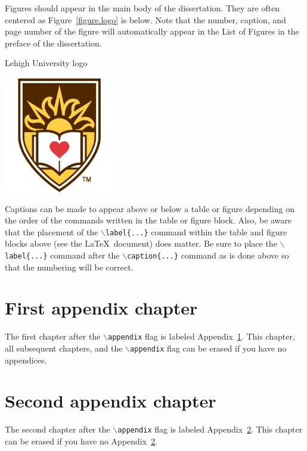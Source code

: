 \documentclass[11pt]{report}
\begin{document}
Figures should appear in the main body of the dissertation.  They are often centered as Figure~\ref{figure.logo} is below.  Note that the number, caption, and page number of the figure will automatically appear in the List of Figures in the preface of the dissertation.

\bfigure[h]
  \centering
  \caption{Lehigh University logo}
  \label{figure.logo}
  \includegraphics[height=2in]{images/lehigh}
\efigure

Captions can be made to appear above or below a table or figure depending on the order of the commands written in the table or figure block.  Also, be aware that the placement of the \texttt{$\backslash$label\{...\}} command within the table and figure blocks above (see the \LaTeX\ document) does matter.  Be sure to place the \texttt{$\backslash$label\{...\}} command after the \texttt{$\backslash$caption\{...\}} command as is done above so that the numbering will be correct.




\appendix
\chapter{First appendix chapter}\label{appendix.first}

The first chapter after the \texttt{$\backslash$appendix} flag is labeled Appendix~\ref{appendix.first}.  This chapter, all subsequent chapters, and the \texttt{$\backslash$appendix} flag can be erased if you have no appendices.

\chapter{Second appendix chapter}\label{appendix.second}

The second chapter after the \texttt{$\backslash$appendix} flag is labeled Appendix~\ref{appendix.second}.  This chapter can be erased if you have no Appendix~\ref{appendix.second}.

\end{document}
